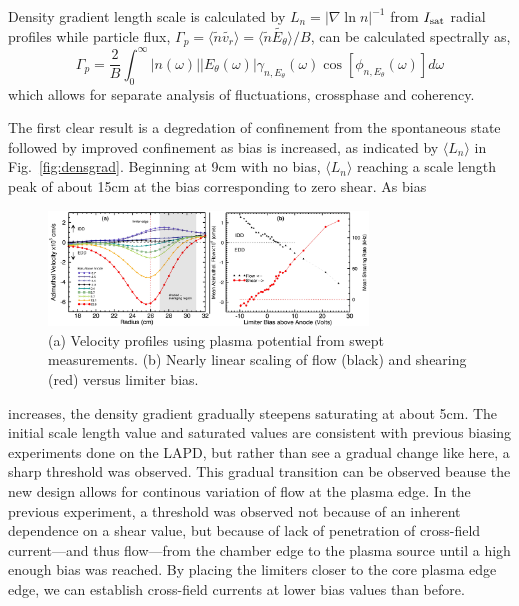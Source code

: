 \documentclass[aps,prl,amsmath,amssymb,preprint,superscriptaddress]{revtex4}
\begin{document}
Density gradient length scale is calculated by $L_{n} = \lvert \nabla \ln n \rvert ^{-1}$ from $I_{\rm sat}$ radial profiles while particle flux, $\Gamma_{p} = \langle \tilde{n} \tilde{v_{r}} \rangle = \langle \tilde{n} \tilde{E_{\theta}} \rangle /B$, can be calculated spectrally as\cite{powers74}, 
\begin{equation}
\Gamma_{p} = \frac{2}{B} \int^{\infty}_{0} \lvert n(\omega) \rvert \lvert E_{\theta}(\omega) \rvert \gamma_{n,E_{\theta}}(\omega) \cos [\phi_{n,E_{\theta}}(\omega)] d\omega
\label{eq:fluxint}
\end{equation}
which allows for separate analysis of fluctuations, crossphase and coherency.

The first clear result is a degredation of confinement from the spontaneous state followed by improved confinement as bias is increased, as indicated by $\langle L_{n}\rangle$ in Fig.~\ref{fig:densgrad}. Beginning at 9cm with no bias, $\langle L_{n}\rangle$ reaching a scale length peak of about 15cm at the bias corresponding to zero shear. As bias
\begin{figure}
\begin{center}
\includegraphics[width=8.5cm]{velocity_flowshear.pdf}%
\caption{\label{fig:velocity_flowshear} (a) Velocity profiles using plasma potential from swept measurements. (b) Nearly linear scaling of flow (black) and shearing (red) versus limiter bias.}
\end{center}
\end{figure}
increases, the density gradient gradually steepens saturating at about 5cm. The initial scale length value and saturated values are consistent with previous biasing experiments done on the LAPD\cite{carter09}, but rather than see a gradual change like here, a sharp threshold was observed. This gradual transition can be observed beause the new design allows for continous variation of flow at the plasma edge. In the previous experiment, a threshold was observed not because of an inherent dependence on a shear value, but because of lack of penetration of cross-field current---and thus flow---from the chamber edge to the plasma source until a high enough bias was reached. By placing the limiters closer to the core plasma edge edge, we can establish cross-field currents at lower bias values than before.
\end{document}

